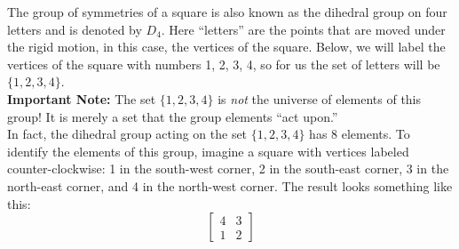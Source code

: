 \documentclass[12pt,reqno]{amsart}
\newcommand{\<}{\ensuremath{\langle}}
\renewcommand{\>}{\ensuremath{\rangle}}
\begin{document}
\begin{enumerate}
\medskip

The group of symmetries of a square is also known as the dihedral group on four
letters and is denoted by $D_4$.
Here ``letters'' are the points that are moved under the rigid motion, in this
case, the vertices of the square. Below, we will label the vertices of the
square with numbers 1, 2, 3, 4, so for us the set of letters will be
$\{1,2,3,4\}$.
\\[4pt]
{\bf Important Note:} The set $\{1,2,3,4\}$ is \emph{not} the universe of
elements of this group!  It is merely a set that the group elements ``act
upon.'' 
\\[4pt]
In fact, the dihedral group acting on the set $\{1, 2, 3, 4\}$ has 8 elements. 
To identify the elements of this group, imagine a square with vertices labeled
counter-clockwise: 1 in the south-west corner, 2 in the south-east corner, 3 in
the north-east corner, and 4 in the north-west corner. The result looks
something like this: 
$$\begin{bmatrix} 4 & 3 \\ 1 & 2 \end{bmatrix}$$


\end{enumerate}
\end{document}
